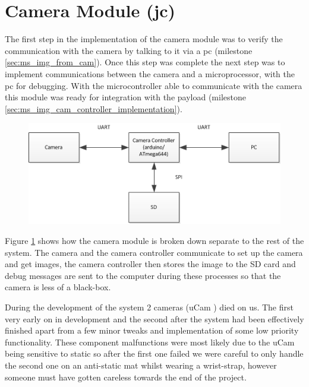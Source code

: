 \section{Camera Module (jc)}
\label{sec:John_Implementation}

The first step in the implementation of the camera module was to verify the communication with the camera by talking to it via a pc (milestone \ref{sec:ms_img_from_cam}). Once this step was complete the next step was to implement communications between the camera and a microprocessor, with the pc for debugging. With the microcontroller able to communicate with the camera this module was ready for integration with the payload (milestone \ref{sec:ms_img_cam_controller_implementation}).

\begin{figure}[H]
        \centering
        \includegraphics[width=1.00\textwidth]{figures/CameraModuleBlock1.png}
        \label{fig:camera_block}
\end{figure}

Figure \ref{fig:camera_block} shows how the camera module is broken down separate to the rest of the system. The camera and the camera controller communicate to set up the camera and get images, the camera controller then stores the image to the SD card and debug messages are sent to the computer during these processes so that the camera is less of a black-box.

During the development of the system 2 cameras (uCam \cite{ucam_datasheet}) died on us. The first very early on in development and the second after the system had been effectively finished apart from a few minor tweaks and implementation of some low priority functionality. These component malfunctions were most likely due to the uCam being sensitive to static so after the first one failed we were careful to only handle the second one on an anti-static mat whilst wearing a wrist-strap, however someone must have gotten careless towards the end of the project.

